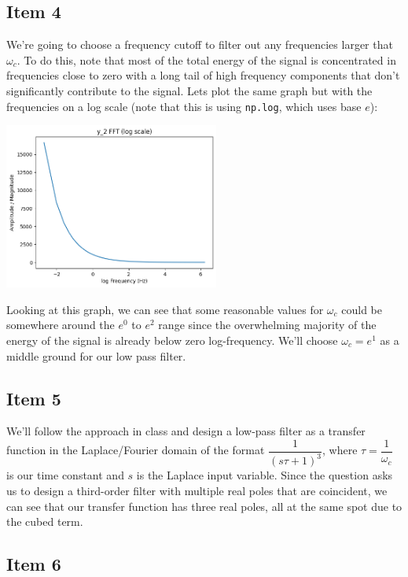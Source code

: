 \documentclass[11pt]{article}
\begin{document}
\subsection{Item 4}

We're going to choose a frequency cutoff to filter out any frequencies larger that $\omega_c$. To do this, note that most of the total energy of the signal is concentrated in frequencies close to zero with a long tail of high frequency components that don't significantly contribute to the signal. Lets plot the same graph but with the frequencies on a log scale (note that this is using \texttt{np.log}, which uses base $e$): 

\includegraphics[width=200pt]{p1_7.png}

Looking at this graph, we can see that some reasonable values for $\omega_c$ could be somewhere around the $e^0$ to $e^2$ range since the overwhelming majority of the energy of the signal is already below zero log-frequency. We'll choose $\omega_c = e^1$ as a middle ground for our low pass filter.

\subsection{Item 5}

We'll follow the approach in class and design a low-pass filter as a transfer function in the Laplace/Fourier domain of the format $\dfrac{1}{(s \tau + 1)^3}$, where $\tau = \dfrac{1}{\omega_c}$ is our time constant and $s$ is the Laplace input variable. Since the question asks us to design a third-order filter with multiple real poles that are coincident, we can see that our transfer function has three real poles, all at the same spot due to the cubed term.

\subsection{Item 6}
\end{document}
